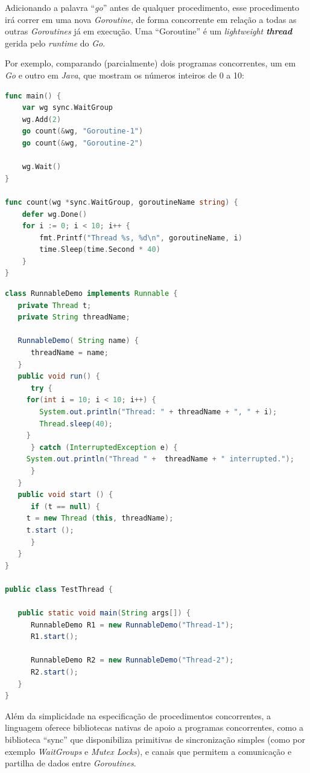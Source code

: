 Adicionando a palavra ``\emph{go}'' antes de qualquer procedimento, esse procedimento irá correr em uma nova \emph{Goroutine},
de forma concorrente em relação a todas as outras \emph{Goroutines} já em execução.
Uma ``Goroutine'' é um \emph{lightweight \textbf{thread}} gerida pelo \emph{runtime} do \emph{Go}.

Por exemplo, comparando (parcialmente) dois programas concorrentes, um em \emph{Go} e outro em \emph{Java}, que mostram os números inteiros de 0 a 10:
\begin{lstlisting}[caption={Exemplo em \emph{Go}, usando a \emph{keyword} ``go'' para começar uma \emph{Goroutine}.},language=Go]
func main() {
	var wg sync.WaitGroup
	wg.Add(2)
	go count(&wg, "Goroutine-1")
	go count(&wg, "Goroutine-2")

	wg.Wait()
}

func count(wg *sync.WaitGroup, goroutineName string) {
	defer wg.Done()
	for i := 0; i < 10; i++ {
		fmt.Printf("Thread %s, %d\n", goroutineName, i)
		time.Sleep(time.Second * 40)
	}
}
\end{lstlisting}


\begin{lstlisting}[caption={Exemplo em \emph{Java}, usando a \emph{interface} ``Runnable'' e uma classe``RunnableDemo'' para começar \emph{threads}.},language=Java]
class RunnableDemo implements Runnable {
   private Thread t;
   private String threadName;

   RunnableDemo( String name) {
      threadName = name;
   }
   public void run() {
      try {
	 for(int i = 10; i < 10; i++) {
	    System.out.println("Thread: " + threadName + ", " + i);
	    Thread.sleep(40);
	 }
      } catch (InterruptedException e) {
	 System.out.println("Thread " +  threadName + " interrupted.");
      }
   }
   public void start () {
      if (t == null) {
	 t = new Thread (this, threadName);
	 t.start ();
      }
   }
}

public class TestThread {

   public static void main(String args[]) {
      RunnableDemo R1 = new RunnableDemo("Thread-1");
      R1.start();

      RunnableDemo R2 = new RunnableDemo("Thread-2");
      R2.start();
   }   
}
\end{lstlisting}

Além da simplicidade na especificação de procedimentos concorrentes, a linguagem oferece bibliotecas nativas de apoio a programas concorrentes,
como a biblioteca ``sync'' que disponibiliza primitivas de sincronização simples 
(como por exemplo \emph{WaitGroups} e \emph{Mutex Locks}), e canais que permitem a comunicação e partilha de dados entre \emph{Goroutines}.

